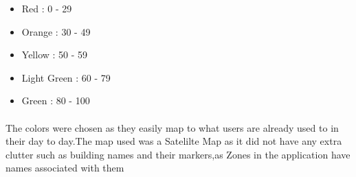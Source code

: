 \begin{itemize}
	\item Red : 0 - 29 
	\item Orange : 30 - 49 
	\item Yellow : 50 - 59 
	\item Light Green : 60 - 79 
	\item Green : 80 - 100
\end{itemize}

\paragraph{}The colors were chosen as they easily map to what users are already used to in their day to day.The map used was a Satelilte Map as it did not have any extra clutter such as building names and their markers,as Zones in the application have names associated with them
\newline

  
